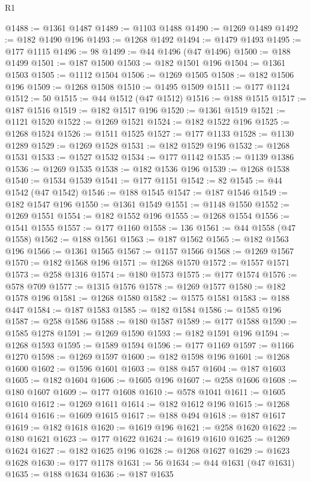 \begin{lexlean}{R1}
\begin{coremodule}
@1488 := @1361 @1487
@1489 := @1103 @1488
@1490 := @1269 @1489
@1492 := @182 @1490 @196
@1493 := @1268 @1492
@1494 := @1479 @1493
@1495 := @177 @1115
@1496 := 98
@1499 := @44 @1496 (@47 @1496)
@1500 := @188 @1499
@1501 := @187 @1500
@1503 := @182 @1501 @196
@1504 := @1361 @1503
@1505 := @1112 @1504
@1506 := @1269 @1505
@1508 := @182 @1506 @196
@1509 := @1268 @1508
@1510 := @1495 @1509
@1511 := @177 @1124
@1512 := 50
@1515 := @44 @1512 (@47 @1512)
@1516 := @188 @1515
@1517 := @187 @1516
@1519 := @182 @1517 @196
@1520 := @1361 @1519
@1521 := @1121 @1520
@1522 := @1269 @1521
@1524 := @182 @1522 @196
@1525 := @1268 @1524
@1526 := @1511 @1525
@1527 := @177 @1133
@1528 := @1130 @1289
@1529 := @1269 @1528
@1531 := @182 @1529 @196
@1532 := @1268 @1531
@1533 := @1527 @1532
@1534 := @177 @1142
@1535 := @1139 @1386
@1536 := @1269 @1535
@1538 := @182 @1536 @196
@1539 := @1268 @1538
@1540 := @1534 @1539
@1541 := @177 @1151
@1542 := 82
@1545 := @44 @1542 (@47 @1542)
@1546 := @188 @1545
@1547 := @187 @1546
@1549 := @182 @1547 @196
@1550 := @1361 @1549
@1551 := @1148 @1550
@1552 := @1269 @1551
@1554 := @182 @1552 @196
@1555 := @1268 @1554
@1556 := @1541 @1555
@1557 := @177 @1160
@1558 := 136
@1561 := @44 @1558 (@47 @1558)
@1562 := @188 @1561
@1563 := @187 @1562
@1565 := @182 @1563 @196
@1566 := @1361 @1565
@1567 := @1157 @1566
@1568 := @1269 @1567
@1570 := @182 @1568 @196
@1571 := @1268 @1570
@1572 := @1557 @1571
@1573 := @258 @1316
@1574 := @180 @1573
@1575 := @177 @1574
@1576 := @578 @709
@1577 := @1315 @1576
@1578 := @1269 @1577
@1580 := @182 @1578 @196
@1581 := @1268 @1580
@1582 := @1575 @1581
@1583 := @188 @447
@1584 := @187 @1583
@1585 := @182 @1584
@1586 := @1585 @196
@1587 := @258 @1586
@1588 := @180 @1587
@1589 := @177 @1588
@1590 := @1585 @1278
@1591 := @1269 @1590
@1593 := @182 @1591 @196
@1594 := @1268 @1593
@1595 := @1589 @1594
@1596 := @177 @1169
@1597 := @1166 @1270
@1598 := @1269 @1597
@1600 := @182 @1598 @196
@1601 := @1268 @1600
@1602 := @1596 @1601
@1603 := @188 @457
@1604 := @187 @1603
@1605 := @182 @1604
@1606 := @1605 @196
@1607 := @258 @1606
@1608 := @180 @1607
@1609 := @177 @1608
@1610 := @578 @1041
@1611 := @1605 @1610
@1612 := @1269 @1611
@1614 := @182 @1612 @196
@1615 := @1268 @1614
@1616 := @1609 @1615
@1617 := @188 @494
@1618 := @187 @1617
@1619 := @182 @1618
@1620 := @1619 @196
@1621 := @258 @1620
@1622 := @180 @1621
@1623 := @177 @1622
@1624 := @1619 @1610
@1625 := @1269 @1624
@1627 := @182 @1625 @196
@1628 := @1268 @1627
@1629 := @1623 @1628
@1630 := @177 @1178
@1631 := 56
@1634 := @44 @1631 (@47 @1631)
@1635 := @188 @1634
@1636 := @187 @1635

\end{coremodule}
\end{lexlean}
